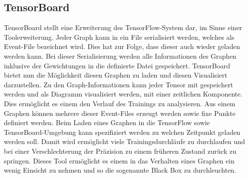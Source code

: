 \subsection{TensorBoard}

TensorBoard stellt eine Erweiterung des TensorFlow-System dar, im Sinne einer Toolerweiterung. 
Jeder Graph kann in ein File serialisiert werden, welches als Event-File bezeichnet wird. 
Dies hat zur Folge, dass dieser auch wieder geladen werden kann. 
Bei dieser Serialisierung werden alle Informationen des Graphen inklusive der Gewichtungen in die definierte Datei gespeichert.
TensorBoard bietet nun die Möglichkeit diesen Graphen zu laden und diesen Visualisiert darzustellen.
Zu den Graph-Informationen kann jeder Tensor mit gespeichert werden und als Diagramm visualisiert werden, mit einer zeitlichen Komponente. 
Dies ermöglicht es einem den Verlauf des Trainings zu analysieren. 
Aus einem Graphen können mehrere dieser Event-Files erzeugt werden sowie fixe Punkte definiert werden. 
Beim Laden eines Graphen in die TensorFlow sowie TensorBoard-Umgebung kann spezifiziert werden zu welchen Zeitpunkt geladen werden soll. 
Damit wird ermöglicht viele Trainingsdurchläufe zu durchlaufen und bei einer Verschlechterung der Präzision zu einem früheren Zustand zurück zu springen.
Dieses Tool ermöglicht es einem in das Verhalten eines Graphen ein wenig Einsicht zu nehmen und so die sogenannte Black Box zu durchleuchten. 

